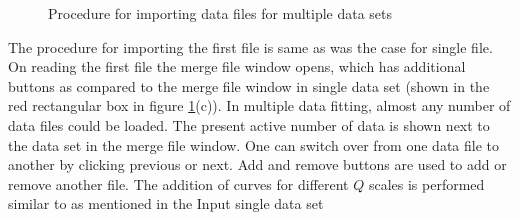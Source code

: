 \begin{figure}[htb]
\centering
\caption{Procedure for importing data files for multiple data sets}
\label{fig:QTmergeMultipleDS2}
\end{figure}
The procedure for importing the first file is same as was the case
for single file. On reading the first file the merge file window
opens, which has additional buttons as compared to the merge file
window in single data set (shown in the red rectangular box in
figure \ref{fig:QTmergeMultipleDS2}(c)). In multiple data fitting,
almost any number of data files could be loaded. The present active
number of data is shown next to the data set in the merge file
window. One can switch over from one data file to another by
clicking previous or next. Add and remove buttons are used to add or
remove another file. The addition of curves for different $Q$ scales
is performed similar to as mentioned in the Input single data set


